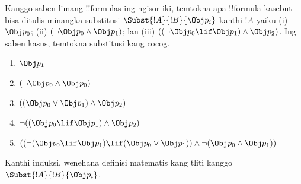 \documentclass[../../../include/open-logic-section]{subfiles}
\begin{document}
\begin{prob} Kanggo saben limang !!{formula}s ing ngisor iki, temtokna apa
 !!{formula} kasebut bisa ditulis minangka substitusi \( \Subst{!A}{!B}{\Obj p_i} \)
 kanthi \( !A \) yaiku (i) \( \Obj p_0 \); (ii) \( ( \lnot \Obj p_0 \land \Obj
 p_1) \); lan (iii) \( ( ( \lnot \Obj p_0 \lif \Obj p_1 ) \land \Obj
 p_2 ) \). Ing saben kasus, temtokna substitusi kang cocog.
  \begin{enumerate}
    \item \( \Obj p_1 \) 
    \item \( ( \lnot \Obj p_0 \land \Obj p_0 ) \)
    \item \( ( ( \Obj p_0 \lor \Obj p_1 ) \land \Obj p_2 )  \)
    \item \( \lnot ( ( \Obj p_0 \lif \Obj p_1 ) \land \Obj p_2 ) \)
    \item \( (( \lnot ( \Obj p_0 \lif \Obj p_1 ) \lif ( \Obj p_0 \lor \Obj p_1 )) \land \lnot ( \Obj p_0 \land \Obj p_1 )) \)
  \end{enumerate}
\end{prob}

\begin{prob}
Kanthi induksi, wenehana definisi matematis kang tliti kanggo
$\Subst{!A}{!B}{\Obj p_i}$.
\end{prob}
\end{document}
